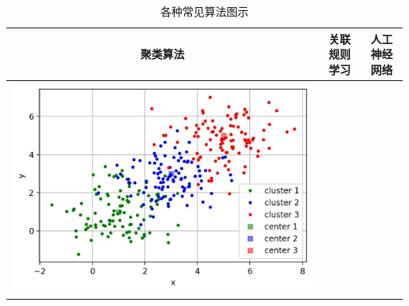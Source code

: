 \begin{longtable}{ccc}
\caption{各种常见算法图示}
\label{fig:2.5.4}\\
\toprule
聚类算法 & 关联规则学习 & 人工神经网络
\tabularnewline
\midrule
\endhead
\begin{minipage}{0.1\linewidth}
  \includegraphics[width=1.0\linewidth]{./img/ch2/sec1/7.jpg}  
\end{minipage}


\end{longtable}
